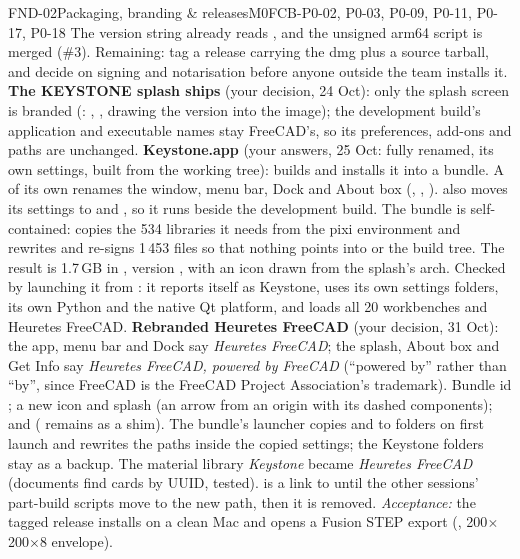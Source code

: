 \begin{epic}{FND-02}{Packaging, branding \& releases}{M0}{\stProg}{FCB-P0-02, P0-03, P0-09, P0-11, P0-17, P0-18}
The version string already reads , and the unsigned arm64  script is merged
(\#3). Remaining: tag a release carrying the dmg plus a source tarball, and decide on signing and
notarisation before anyone outside the team installs it.
\textbf{The KEYSTONE splash ships} (your decision, 24 Oct): only the splash screen is branded
(: , ,  drawing the
version into the image); the development build's application and executable names stay FreeCAD's, so its
preferences, add-ons and paths are unchanged.
\textbf{Keystone.app} (your answers, 25 Oct: fully renamed, its own settings, built from the working tree):
 builds  and installs it into a bundle. A
 of its own renames the window, menu bar, Dock and About box (,
, ).  also moves its settings to
 and , so it runs beside the
development build. The bundle is self-contained:  copies the 534 libraries it needs from the
pixi environment and rewrites and re-signs 1\,453 files so that nothing points into  or the build tree.
The result is 1.7\,GB in , version , with an icon drawn from the
splash's arch. Checked by launching it from : it reports itself as Keystone, uses its own settings
folders, its own Python and the native Qt platform, and loads all 20 workbenches and Heuretes FreeCAD.
\textbf{Rebranded Heuretes FreeCAD} (your decision, 31 Oct): the app, menu bar and Dock say \emph{Heuretes FreeCAD}; the
splash, About box and Get Info say \emph{Heuretes FreeCAD, powered by FreeCAD} (``powered by'' rather than ``by'', since
FreeCAD is the FreeCAD Project Association's trademark). Bundle id ; a new icon and splash
(an arrow from an origin with its dashed components);  and 
( remains as a shim). The bundle's launcher copies  and
 to  folders on first launch and rewrites the paths inside the
copied settings; the Keystone folders stay as a backup. The material library \emph{Keystone} became \emph{Heuretes FreeCAD}
(documents find cards by UUID, tested).  is a link to  until
the other sessions' part-build scripts move to the new path, then it is removed.
\emph{Acceptance:} the tagged release installs on a clean Mac and opens a Fusion STEP export
(, 200$\times$200$\times$8 envelope).
\end{epic}

